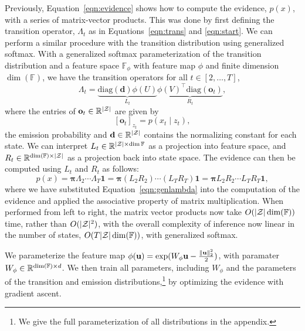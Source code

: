 \documentclass{article}
\begin{document}
Previously, Equation~\ref{eqn:evidence} shows how to compute the evidence,
$p(x)$, with a series of matrix-vector products.
This was done by first defining the transition operator,
$\Lambda_t$ as in Equations~\ref{eqn:trans} and \ref{eqn:start}.
We can perform a similar procedure with the transition distribution using generalized softmax.
With a generalized softmax parameterization of the transition distribution
and a feature space $\mathbb{F}_\phi$ with feature map $\phi$ and finite dimension $\dim(\mathbb{F})$,
we have the transition operators for all $t \in [2, \ldots, T]$,
\begin{equation}
\label{eqn:genlambda}
\Lambda_t =
\underbrace{\textrm{diag}(\mathbf{d})\phi(U)}_{L_t}\underbrace{{\phi(V)}^\top\textrm{diag}(\mathbf{o}_t)}_{R_t},
\end{equation}
where the entries of $\mathbf{o}_t\in\mathbb{R}^{|\mathcal{Z}|}$
are given by
$$
[\mathbf{o}_t]_{z_t} = p(x_t \mid z_t),
$$
the emission probability and $\mathbf{d}\in\mathbb{R}^{|\mathcal{Z}|}$ contains the normalizing constant
for each state.
We can interpret $L_t\in\mathbb{R}^{|\mathcal{Z}|\times\dim{\mathbb{F}}}$ as a 
projection into feature space, and $R_t\in\mathbb{R}^{\dim(\mathbb{F})\times|\mathcal{Z}|}$
as a projection back into state space.
The evidence can then be computed using $L_t$ and $R_t$ as follows:
\begin{equation}
\label{eqn:genevidence}
p(x)
= \bm\pi\Lambda_2\cdots\Lambda_T\mathbf{1}
= \bm\pi(L_2R_2)\cdots (L_TR_T)\mathbf{1}
= \bm\pi L_2R_2\cdots L_TR_T\mathbf{1},
\end{equation}
where we have substituted Equation~\ref{eqn:genlambda} into the computation of the evidence
and applied the associative property of matrix multiplication.
When performed from left to right, the matrix vector products now take $O(|\mathcal{Z}|\dim(\mathbb{F}))$
time, rather than $O(|\mathcal{Z}|^2)$,
with the overall complexity of inference now linear in the number of states,
$O(T|\mathcal{Z}|\dim(\mathbb{F}))$,
with generalized softmax.

We parameterize the feature map $\phi(\mathbf{u}) = \exp(W_\phi\mathbf{u} - \frac{\|\mathbf{u}\|_2^2}{2})$,
with paramater $W_\phi\in\mathbb{R}^{\dim(\mathbb{F})\times d}$.
We then train all parameters,
including $W_\phi$ and the parameters of the transition and emission distributions,\footnote{
We give the full parameterization of all distributions in the appendix.
}
by optimizing the evidence with gradient ascent.
\end{document}
